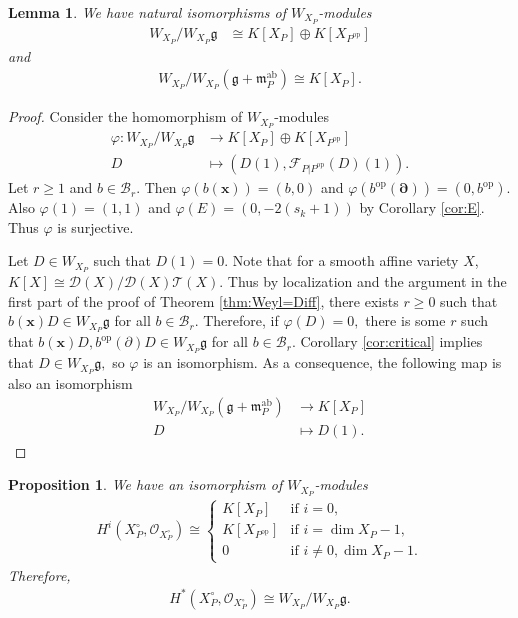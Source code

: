 \documentclass[11pt,a4paper,usenames,dvipsnames,reqno]{amsart}
\numberwithin{equation}{section}
\newtheorem{Prop}[Thm]{Proposition}
\newtheorem{Lem}[Thm]{Lemma}
\theoremstyle{definition}
\theoremstyle{remark}
\begin{document}
\begin{Lem}\label{lem:structure}
    We have natural isomorphisms of $W_{X_P}$-modules
    \begin{align*}
        W_{X_P}/W_{X_P}\mathfrak{g}&\cong K[X_P] \oplus K[X_{P^{\mathrm{op}}}]
    \end{align*}
    and
    \begin{align*}
    W_{X_P}/W_{X_P}(\mathfrak{g}+\mathfrak{m}_P^{\mathrm{ab}})\cong K[X_P].
    \end{align*}
\end{Lem}

\begin{proof}
Consider the homomorphism of $W_{X_P}$-modules 
 \begin{align*}
        \varphi:W_{X_P}/W_{X_P}\mathfrak{g}&\longrightarrow K[X_P] \oplus K[X_{P^{\mathrm{op}}}]\\
    D&\mapsto (D(1),\mathcal{F}_{P|P^{\mathrm{op}}}(D)(1)).
    \end{align*}
Let $r\ge 1$ and $b\in \mathcal{B}_r$. Then $\varphi(b(\mathbf{x}))=(b,0)$ and $\varphi(b^{\mathrm{op}}(\mathbf{\partial}))=(0,b^{\mathrm{op}}).$ Also $\varphi(1)=(1,1)$ and $\varphi(E)=(0,-2(s_k+1))$ by Corollary \ref{cor:E}. Thus $\varphi$ is surjective. 

Let $D\in W_{X_P}$ such that $D(1)=0$. Note that for a smooth affine variety $X$, $K[X]\cong \mathcal{D}(X)/\mathcal{D}(X)\mathcal{T}(X).$ Thus by localization and the argument in the first part of the proof of Theorem \ref{thm:Weyl=Diff}, there exists $r\ge 0$ such that $b(\mathbf{x})D\in W_{X_P}\mathfrak{g}$ for all $b\in \mathcal{B}_r$. Therefore, if $\varphi(D)=0,$ there is some $r$ such that  $b(\mathbf{x})D, b^{\mathrm{op}}(\partial)D\in W_{X_P}\mathfrak{g}$ for all $b\in \mathcal{B}_r$. Corollary \ref{cor:critical} implies that $D\in W_{X_P}\mathfrak{g},$ so $\varphi$ is an isomorphism. As a consequence, the following map is also an isomorphism
\begin{align*}
W_{X_P}/W_{X_P}(\mathfrak{g}+\mathfrak{m}_P^{\mathrm{ab}})&\longrightarrow K[X_P] \\
    D&\mapsto D(1).
\end{align*}
\end{proof}

\begin{Prop}
We have an isomorphism of $W_{X_P}$-modules 
\begin{align*}
    H^{i}(X_P^\circ,\mathcal{O}_{X_P^\circ})\cong\begin{cases}
        K[X_P] & \textrm{if } i=0,\\
        K[X_{P^{\mathrm{op}}}] & \textrm{if } i=\dim X_P-1,\\
        0 & \textrm{if } i\neq 0,\dim X_P-1.
    \end{cases} 
\end{align*}
Therefore,
\begin{align*}
    H^\ast(X_P^\circ,\mathcal{O}_{X_P^\circ})\cong W_{X_P}/W_{X_P}\mathfrak{g}.
\end{align*}
\end{Prop}
\end{document}
